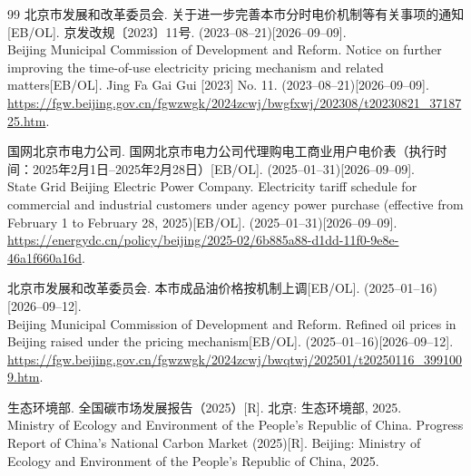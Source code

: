 \documentclass{setp-new}
\begin{document}
\begin{thebibliography}{99}
 北京市发展和改革委员会. 关于进一步完善本市分时电价机制等有关事项的通知\mbox{[EB/OL]}. 京发改规〔2023〕11号. (2023--08--21)[2026--09--09].\\
Beijing Municipal Commission of Development and Reform. Notice on further improving the time-of-use electricity pricing mechanism and related matters\mbox{[EB/OL]}. Jing Fa Gai Gui [2023] No. 11. (2023--08--21)[2026--09--09].\\
\url{https://fgw.beijing.gov.cn/fgwzwgk/2024zcwj/bwgfxwj/202308/t20230821_3718725.htm}.


 国网北京市电力公司. 国网北京市电力公司代理购电工商业用户电价表（执行时间：2025年2月1日--2025年2月28日）\mbox{[EB/OL]}. (2025--01--31)[2026--09--09].\\
State Grid Beijing Electric Power Company. Electricity tariff schedule for commercial and industrial customers under agency power purchase (effective from February 1 to February 28, 2025)\mbox{[EB/OL]}. (2025--01--31)[2026--09--09].\\
\url{https://energydc.cn/policy/beijing/2025-02/6b885a88-d1dd-11f0-9e8e-46a1f660a16d}.

 北京市发展和改革委员会. 本市成品油价格按机制上调\mbox{[EB/OL]}. (2025--01--16)[2026--09--12].\\
Beijing Municipal Commission of Development and Reform. Refined oil prices in Beijing raised under the pricing mechanism\mbox{[EB/OL]}. (2025--01--16)[2026--09--12].\\
\url{https://fgw.beijing.gov.cn/fgwzwgk/2024zcwj/bwqtwj/202501/t20250116_3991009.htm}.

 生态环境部. 全国碳市场发展报告（2025）[R]. 北京: 生态环境部, 2025.\\
Ministry of Ecology and Environment of the People's Republic of China. Progress Report of China's National Carbon Market (2025)[R]. Beijing: Ministry of Ecology and Environment of the People's Republic of China, 2025.



\end{thebibliography}
\end{document}
